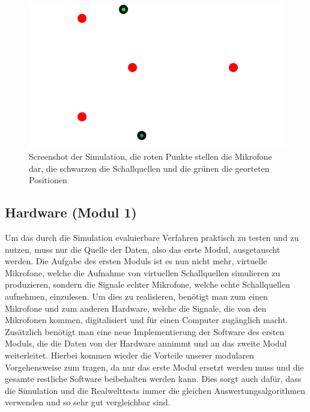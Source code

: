   \begin{figure}[H]
  \includegraphics[width=\linewidth]{img/bildsimulation}
  \caption{Screenshot der Simulation, die roten Punkte stellen die Mikrofone dar, die schwarzen die Schallquellen und die grünen die georteten Positionen}
  \end{figure}

  \subsection{Hardware (Modul 1)}
  Um das durch die Simulation evaluierbare Verfahren praktisch zu testen und zu nutzen, muss nur die Quelle der Daten, also das erste Modul, ausgetauscht werden. Die Aufgabe des ersten Moduls ist es nun nicht mehr, virtuelle Mikrofone, welche die Aufnahme von virtuellen Schallquellen simulieren zu produzieren, sondern die Signale echter Mikrofone, welche echte Schallquellen aufnehmen, einzulesen. Um dies zu realisieren, benötigt man zum einen Mikrofone und zum anderen Hardware, welche die Signale, die von den Mikrofonen kommen, digitalisiert und für einen Computer zugänglich macht. Zusätzlich benötigt man eine neue Implementierung der Software des ersten Moduls, die die Daten von der Hardware annimmt und an das zweite Modul weiterleitet. Hierbei kommen wieder die Vorteile unserer modularen Vorgehensweise zum tragen, da nur das erste Modul ersetzt werden muss und die gesamte restliche Software beibehalten werden kann. Dies sorgt auch dafür, dass die Simulation und die Realwelttests immer die gleichen Auswertungsalgorithmen verwenden und so sehr gut vergleichbar sind. 

